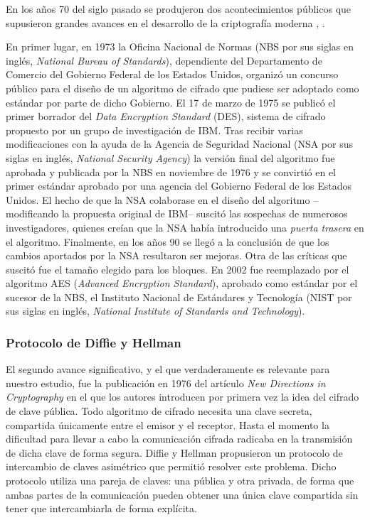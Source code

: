 \documentclass[
  a4paper,
  12pt,
  spanish,
]{scrartcl}
\begin{document}
En los años 70 del siglo pasado se produjeron dos acontecimientos públicos que supusieron grandes avances en el desarrollo de la criptografía moderna \parencite{singh_code_2003}, \parencite{thawte_history_2013}.

En primer lugar, en 1973 la Oficina Nacional de Normas (NBS por sus siglas en inglés, \textit{National Bureau of Standards}), dependiente del Departamento de Comercio del Gobierno Federal de los Estados Unidos, organizó un concurso público para el diseño de un algoritmo de cifrado que pudiese ser adoptado como estándar por parte de dicho Gobierno.
El 17 de marzo de 1975 se publicó el primer borrador del \textit{Data Encryption Standard} (DES), sistema de cifrado propuesto por un grupo de investigación de IBM.
Tras recibir varias modificaciones con la ayuda de la Agencia de Seguridad Nacional (NSA por sus siglas en inglés, \textit{National Security Agency}) la versión final del algoritmo fue aprobada y publicada por la NBS en noviembre de 1976 y se convirtió en el primer estándar aprobado por una agencia del Gobierno Federal de los Estados Unidos.
El hecho de que la NSA colaborase en el diseño del algoritmo --modificando la propuesta original de IBM-- suscitó las sospechas de numerosos investigadores, quienes creían que la NSA había introducido una \textit{puerta trasera} en el algoritmo.
Finalmente, en los años 90 se llegó a la conclusión de que los cambios aportados por la NSA resultaron ser mejoras.
Otra de las críticas que suscitó fue el tamaño elegido para los bloques.
En 2002 fue reemplazado por el algoritmo AES (\textit{Advanced Encryption Standard}), aprobado como estándar por el sucesor de la NBS, el Instituto Nacional de Estándares y Tecnología (NIST por sus siglas en inglés, \textit{National Institute of Standards and Technology}).

\subsubsection{Protocolo de Diffie y Hellman}

El segundo avance significativo, y el que verdaderamente es relevante para nuestro estudio, fue la publicación en 1976 del artículo \textit{New Directions in Cryptography} \parencite{diffie_new_1976} en el que los autores introducen por primera vez la idea del cifrado de clave pública.
Todo algoritmo de cifrado necesita una clave secreta, compartida únicamente entre el emisor y el receptor.
Hasta el momento la dificultad para llevar a cabo la comunicación cifrada radicaba en la transmisión de dicha clave de forma segura.
Diffie y Hellman propusieron un protocolo de intercambio de claves asimétrico que permitió resolver este problema.
Dicho protocolo utiliza una pareja de claves: una pública y otra privada, de forma que ambas partes de la comunicación pueden obtener una única clave compartida sin tener que intercambiarla de forma explícita.
\end{document}
